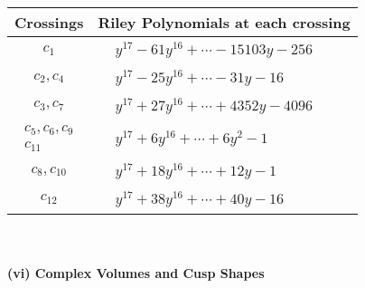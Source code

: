 \documentclass[1p]{elsarticle_modified}
\theoremstyle{definition}
\begin{document}
\begin{tabular}{m{50pt}|m{274pt}}
Crossings & \hspace{64pt}Riley Polynomials at each crossing \\
\hline $$\begin{aligned}c_{1}\end{aligned}$$&$\begin{aligned}
&y^{17}-61 y^{16}+\cdots-15103 y-256
\end{aligned}$\\
\hline $$\begin{aligned}c_{2},c_{4}\end{aligned}$$&$\begin{aligned}
&y^{17}-25 y^{16}+\cdots-31 y-16
\end{aligned}$\\
\hline $$\begin{aligned}c_{3},c_{7}\end{aligned}$$&$\begin{aligned}
&y^{17}+27 y^{16}+\cdots+4352 y-4096
\end{aligned}$\\
\hline $$\begin{aligned}c_{5},c_{6},c_{9}\\c_{11}\end{aligned}$$&$\begin{aligned}
&y^{17}+6 y^{16}+\cdots+6 y^2-1
\end{aligned}$\\
\hline $$\begin{aligned}c_{8},c_{10}\end{aligned}$$&$\begin{aligned}
&y^{17}+18 y^{16}+\cdots+12 y-1
\end{aligned}$\\
\hline $$\begin{aligned}c_{12}\end{aligned}$$&$\begin{aligned}
&y^{17}+38 y^{16}+\cdots+40 y-16
\end{aligned}$\\
\hline
\end{tabular}\\~\\
\newpage\flushleft \textbf{(vi) Complex Volumes and Cusp Shapes}
\end{document}
